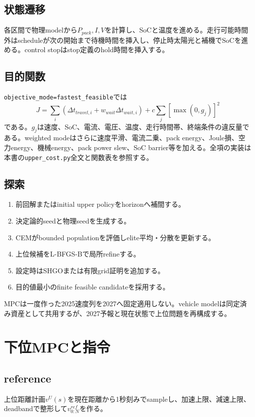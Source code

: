 \documentclass[a4paper,10pt,oneside]{book}
\begin{document}
\section{状態遷移}
各区間で物理modelから$P_{pack},I,V$を計算し、SoCと温度を進める。走行可能時間外はscheduleが次の開始まで待機時間を挿入し、停止時太陽光と補機でSoCを進める。control stopはstop定義のhold時間を挿入する。

\section{目的関数}
\texttt{objective\_mode=fastest\_feasible}では
\[
J=\sum_i(\Delta t_{travel,i}+w_{wait}\Delta t_{wait,i})
+c\sum_j[\max(0,g_j)]^2
\]
である。$g_j$は速度、SoC、電流、電圧、温度、走行時間帯、終端条件の違反量である。weighted modeはさらに速度平滑、電流二乗、pack energy、Joule損、空力energy、機械energy、pack power slew、SoC barrier等を加える。全項の実装は本書の\texttt{upper\_cost.py}全文と関数表を参照する。

\section{探索}
\begin{enumerate}[leftmargin=2.4em]
\item 前回解またはinitial upper policyをhorizonへ補間する。
\item 決定論的seedと物理seedを生成する。
\item CEMがbounded populationを評価しelite平均・分散を更新する。
\item 上位候補をL-BFGS-Bで局所refineする。
\item 設定時はSHGOまたは有限grid証明を追加する。
\item 目的値最小のfinite feasible candidateを採用する。
\end{enumerate}
MPCは一度作った2025速度列を2027へ固定適用しない。vehicle modelは同定済み資産として共用するが、2027予報と現在状態で上位問題を再構成する。

\chapter{下位MPCと指令}
\section{reference}
上位距離計画$v^U(s)$を現在距離から1秒刻みでsampleし、加速上限、減速上限、deadbandで整形して$v^{ref}_{0:N}$を作る。
\end{document}
